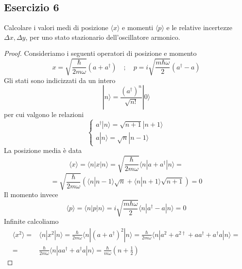 \subsection{Esercizio 6}

Calcolare i valori medi di posizione $\langle x \rangle $ e momenti $\langle p \rangle$ e le relative incertezze $\Delta x, \Delta y$, per uno stato stazionario dell'oscillatore armonico.
\begin{proof}
Consideriamo i seguenti operatori di posizione e momento
\begin{equation*}
	x = \sqrt{\frac{\hbar}{2m \omega}}(a+a^{\dag}) \quad ; \quad p = i \sqrt{\frac{m\hbar \omega}{2}}(a^{\dag}-a)
\end{equation*}	
Gli stati sono indicizzati da un intero 
\begin{equation*}
	|n \rangle = \frac{(a^{\dag})^n}{\sqrt{n!}}|0 \rangle 
\end{equation*}
per cui valgono le relazioni
\begin{equation*}
	\left \{ \begin{array}{l}
		a^{\dag}|n \rangle = \sqrt{n+1}|n+1 \rangle \\[0.3cm]
		a |n \rangle = \sqrt{n} |n-1 \rangle 
	\end{array}\right.
\end{equation*}
La posizione media \`e data 
\begin{equation*}
	\langle x \rangle = \langle n| x | n \rangle = \sqrt{\frac{\hbar}{2m \omega}} \langle n|a+a^{\dag}|n\rangle =
\end{equation*}
\newpage
\begin{equation*}
	=\sqrt{\frac{\hbar}{2m \omega}}(\langle n|n-1 \rangle \sqrt{n} + \langle n |n+1 \rangle \sqrt{n+1}) = 0
\end{equation*}
Il momento invece 
\begin{equation*}
	\langle p \rangle = \langle n|p|n \rangle = i \sqrt{\frac{m \hbar \omega}{2}} \langle n|a^{\dag} -a|n\rangle = 0
\end{equation*}
Infinite calcoliamo
\begin{align*}
	\langle x^2 \rangle = & \langle n| x^2|n\rangle  = \frac{\hbar}{2m \omega} \langle n| (a+a^{\dag})^2|n\rangle = \frac{\hbar}{2m \omega} \langle n| a^2 + a^{2 \dag} + aa^{\dag} +a^{\dag}a|n\rangle  = \\[0.5cm]
	 = &  \frac{\hbar}{2m \omega} \langle n| aa^{\dag} + a^{\dag}a |n \rangle = \frac{\hbar}{m \omega} \left (n + \frac{1}{2} \right ) 
\end{align*}

\end{proof}
